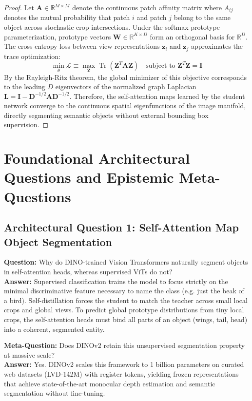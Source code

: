 \documentclass[11pt,a4paper]{article}
\theoremstyle{definition}
\begin{document}
\begin{proof}
Let $\mathbf{A} \in \mathbb{R}^{M \times M}$ denote the continuous patch affinity matrix where $A_{ij}$ denotes the mutual probability that patch $i$ and patch $j$ belong to the same object across stochastic crop intersections.
Under the softmax prototype parameterization, prototype vectors $\mathbf{W} \in \mathbb{R}^{K \times D}$ form an orthogonal basis for $\mathbb{R}^D$.
The cross-entropy loss between view representations $\mathbf{z}_i$ and $\mathbf{z}_j$ approximates the trace optimization:
{\boldmath
\begin{equation}
\min_{\theta} \mathcal{L} \equiv \max_{\mathbf{Z}} \operatorname{Tr}\left( \mathbf{Z}^T \mathbf{A} \mathbf{Z} \right) \quad \text{subject to } \mathbf{Z}^T \mathbf{Z} = \mathbf{I}
\end{equation}
}
By the Rayleigh-Ritz theorem, the global minimizer of this objective corresponds to the leading $D$ eigenvectors of the normalized graph Laplacian $\mathbf{L} = \mathbf{I} - \mathbf{D}^{-1/2}\mathbf{A}\mathbf{D}^{-1/2}$.
Therefore, the self-attention maps learned by the student network converge to the continuous spatial eigenfunctions of the image manifold, directly segmenting semantic objects without external bounding box supervision.
\end{proof}

\section{Foundational Architectural Questions and Epistemic Meta-Questions}

\subsection{Architectural Question 1: Self-Attention Map Object Segmentation}
\textbf{Question:} Why do DINO-trained Vision Transformers naturally segment objects in self-attention heads, whereas supervised ViTs do not?\\
\textbf{Answer:} Supervised classification trains the model to focus strictly on the minimal discriminative feature necessary to name the class (e.g. just the beak of a bird). Self-distillation forces the student to match the teacher across small local crops and global views. To predict global prototype distributions from tiny local crops, the self-attention heads must bind all parts of an object (wings, tail, head) into a coherent, segmented entity.

\textbf{Meta-Question:} Does DINOv2 retain this unsupervised segmentation property at massive scale?\\
\textbf{Answer:} Yes. DINOv2 scales this framework to 1 billion parameters on curated web datasets (LVD-142M) with register tokens, yielding frozen representations that achieve state-of-the-art monocular depth estimation and semantic segmentation without fine-tuning.
\end{document}
